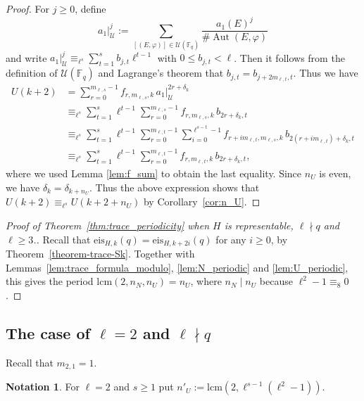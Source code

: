 \documentclass[10pt]{article}
\theoremstyle{definition}
\newtheorem{notation}[theorem]{Notation}
\let\phi\varphi
\DeclareMathOperator\Aut{Aut}
\renewcommand{\:}{\colon}
\newcommand{\bF}{\mathbb{F}}
\begin{document}
\begin{proof}
    For $j \geq 0$, define
    \[
    a_1|_{\mathcal U}^{j} := \sum_{[(E,\phi)] \in \mathcal U(\bF_q)} \frac{a_1(E)^{j}}{\# \Aut(E,\phi)}
    \]
    and write $a_1|_{\mathcal U}^{j} \equiv_{\ell^s} \sum_{t=1}^s b_{j,t} \ell^{t-1}$ with $0 \leq b_{j,t} < \ell$. Then it follows from the definition of $\mathcal U(\bF_q)$ and Lagrange's theorem that $b_{j,t} = b_{j+2m_{\ell,t},t}$. Thus we have
    \begin{align*}
    U(k+2) &= \sum_{r=0}^{m_{\ell,s}-1} f_{r,m_{\ell,s},k} \,a_1|_{\mathcal U}^{2r+\delta_k} \\
    &\equiv_{\ell^s} \sum_{t=1}^s \ell^{t-1} \sum_{r=0}^{m_{\ell,s}-1} f_{r,m_{\ell,s},k}\, b_{2r+\delta_k,t} \\
    &\equiv_{\ell^s} \sum_{t=1}^s \ell^{t-1} \sum_{r=0}^{m_{\ell,t}-1} \sum_{i=0}^{\ell^{s-t}-1} f_{r+im_{\ell,t},m_{\ell,s},k} \,b_{2(r+im_{\ell,t})+\delta_k,t} \\
    &\equiv_{\ell^s} \sum_{t=1}^s \ell^{t-1} \sum_{r=0}^{m_{\ell,t}-1} f_{r,m_{\ell,t},k} \,b_{2r+\delta_k,t},
    \end{align*}
    where we used Lemma \ref{lem:f_sum} to obtain the last equality. Since $n_U$ is even, we have $\delta_k = \delta_{k+n_U}$. Thus the above expression shows that $U(k+2) \equiv_{\ell^s} U(k+2+n_U)$ by Corollary~\ref{cor:n_U}.
\end{proof}


\begin{proof}[Proof of Theorem~\ref{thm:trace_periodicity} when $H$ is representable, $\ell \nmid q$ and $\ell \geq 3$.]

Recall that $\mathrm{eis}_{H,k}(q)=\mathrm{eis}_{H,k+2i}(q)$ for any $i \geq 0$, by Theorem~\ref{theorem-trace-Sk}. 
Together with Lemmas~\ref{lem:trace_formula_modulo}, \ref{lem:N_periodic} and \ref{lem:U_periodic}, this gives the period $\text{lcm}(2,n_N,n_U) = n_U$, where $n_N \mid n_U$ because $\ell^2-1 \equiv_8 0$.
\end{proof}  

\subsection{The case of \texorpdfstring{$\ell=2$ and $\ell \nmid q$}{elltwo}}\label{sec:ell=2}
Recall that $m_{2,1}=1$. 

\begin{notation} For $\ell=2$ and $s\geq 1$ put $n'_{U} := \text{lcm}(2,\ell^{s-1}(\ell^2-1))$. 
\end{notation}
\end{document}
